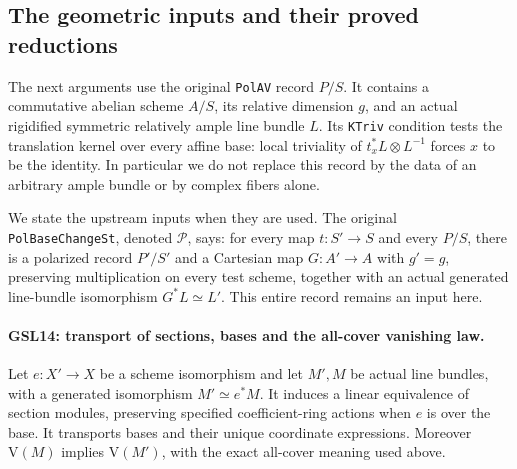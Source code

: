 \documentclass[11pt,a4paper]{article}
\numberwithin{equation}{section}
\theoremstyle{remark}\newtheorem{remark}[theorem]{Remark}
\begin{document}
\subsection{The geometric inputs and their proved reductions}

The next arguments use the original \texttt{Pol\allowbreak AV} record $P/S$.
It contains a commutative abelian scheme $A/S$, its relative dimension
$g$, and an actual rigidified symmetric relatively ample line bundle
$L$.  Its \texttt{KTriv} condition tests the translation kernel over
every affine base: local triviality of $t_x^*L\otimes L^{-1}$ forces
$x$ to be the identity.  In particular we do not replace this record
by the data of an arbitrary ample bundle or by complex fibers alone.

We state the upstream inputs when they are used.  The original
\texttt{Pol\allowbreak Base\allowbreak Change\allowbreak St}, denoted $\mathcal P$, says: for every map
$t:S'\to S$ and every $P/S$, there is a polarized record $P'/S'$
and a Cartesian map $G:A'\to A$ with $g'=g$, preserving multiplication
on every test scheme, together with an actual generated
line-bundle isomorphism $G^*L\simeq L'$.  This entire record remains
an input here.

\paragraph{GSL14: transport of sections, bases and the all-cover vanishing law.}
\label{claim:GSL14}
Let $e:X'\to X$ be a scheme isomorphism and let $M',M$ be actual
line bundles, with a generated isomorphism $M'\simeq e^*M$.
It induces a linear equivalence of section modules, preserving
specified coefficient-ring actions when $e$ is over the base.
It transports bases and their unique coordinate expressions.
Moreover $\mathrm V(M)$ implies $\mathrm V(M')$, with the exact
all-cover meaning used above.
\end{document}
